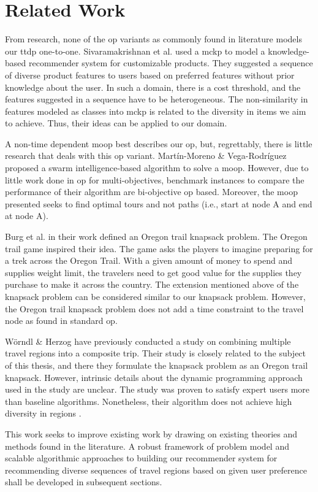 \section{Related Work}
From research, none of the \gls{op} variants as commonly found in literature models our \gls{ttdp} one-to-one. Sivaramakrishnan et al. \parencite{MCKP_CustomProducts} used a \gls{mckp} to model a knowledge-based recommender system for customizable products. They suggested a sequence of diverse product features to users based on preferred features without prior knowledge about the user. In such a domain, there is a cost threshold, and the features suggested in a sequence have to be heterogeneous. The non-similarity in features modeled as classes into \gls{mckp} is related to the diversity in items we aim to achieve. Thus, their ideas can be applied to our domain. 

A non-time dependent \gls{moop} best describes our \gls{op}, but, regrettably, there is little research that deals with this \gls{op} variant. Martín-Moreno \& Vega-Rodríguez \parencite{Martin-Moreno2018Multi-ObjectiveProblem} proposed a swarm intelligence-based algorithm to solve a \gls{moop}. However, due to little work done in \gls{op} for multi-objectives, benchmark instances to compare the performance of their algorithm are bi-objective \gls{op} based. Moreover, the \gls{moop} presented seeks to find optimal tours and not paths (i.e., start at node A and end at node A).

Burg et al. \parencite{Oregon_Trail_Knapsack} in their work defined an Oregon trail knapsack problem. The Oregon trail game inspired their idea. The game asks the players to imagine preparing for a trek across the Oregon Trail. With a given amount of money to spend and supplies weight limit, the travelers need to get good value for the supplies they purchase to make it across the country. The extension mentioned above of the knapsack problem can be considered similar to our knapsack problem. However, the Oregon trail knapsack problem does not add a time constraint to the travel node as found in standard \gls{op}. 

Wörndl \& Herzog \parencite{cbrecsys2014} have previously conducted a study on combining multiple travel regions into a composite trip. Their study is closely related to the subject of this thesis, and there they formulate the knapsack problem as an Oregon trail knapsack. However, intrinsic details about the dynamic programming approach used in the study are unclear. The study was proven to satisfy expert users more than baseline algorithms. Nonetheless, their algorithm does not achieve high diversity in regions \parencite{cbrecsys2014}.

This work seeks to improve existing work by drawing on existing theories and methods found in the literature. A robust framework of problem model and scalable algorithmic approaches to building our recommender system for recommending diverse sequences of travel regions based on given user preference shall be developed in subsequent sections.
